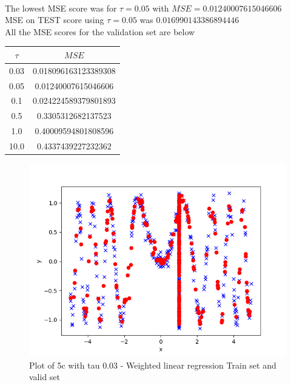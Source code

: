\begin{answer}\\
The lowest MSE score was for $\tau=0.05$ with $MSE=0.01240007615046606$\\
MSE on TEST score using $\tau=0.05$ was $0.016990143386894446$\\
All the MSE scores for the validation set are below
\begin{center}
\begin{tabular}{ |c|c| } 
 \hline
 $\tau$ & $MSE$ \\ 
 \hline
 0.03 & 0.018096163123389308 \\
 0.05 & 0.01240007615046606 \\
 0.1 & 0.024224589379801893 \\
 0.5 & 0.3305312682137523 \\
 1.0 & 0.40009594801808596 \\
 10.0 & 0.4337439227232362 \\ \hline
\end{tabular}
\end{center}
\begin{figure}
  \includegraphics[width=\linewidth]{../src/output/p05c_plot_0_03_tau.png}
  \caption{Plot of 5c with tau 0.03 - Weighted linear regression Train set and valid set}
  \label{fig:Plot of 5c with tau 0.03 - Weighted linear regression Train set and valid set}
\end{figure}
\begin{figure}

\end{figure}
\end{answer}
